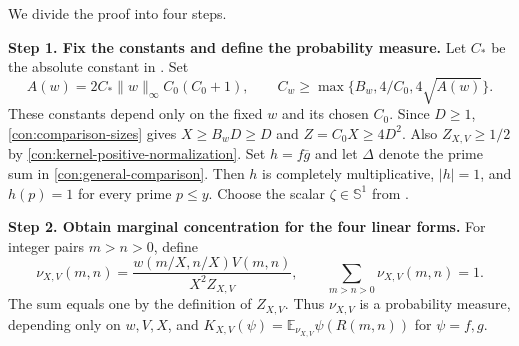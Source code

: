 \documentclass[twoside]{aomart}
\makeatletter
\theoremstyle{paperplain}
\theoremstyle{paperdefinition}
\renewenvironment{proof}[1][\proofname]{\par\pushQED{\qed}%
  \normalfont\topsep6\p@\@plus3\p@\relax\trivlist
  \item[\hskip\labelsep\itshape #1\@addpunct{.}]\ignorespaces
}{\popQED\endtrivlist\@endpefalse}
\newcommand{\E}{\mathbb E}
\numberwithin{equation}{section}
\makeatother
\begin{document}
\begin{proof}
We divide the proof into four steps.

\medskip
\noindent\textbf{Step 1. Fix the constants and define the probability measure.}
Let $C_*$ be the absolute constant in .
Set
\begin{equation}
 A(w)=2C_*\|w\|_\infty C_0(C_0+1),
 \qquad C_w\ge\max\{B_w,4/C_0,4\sqrt{A(w)}\}.
 \label{con:comparison-constants}
\end{equation}
These constants depend only on the fixed $w$ and its chosen $C_0$.
Since $D\ge1$, \eqref{con:comparison-sizes} gives
$X\ge B_wD\ge D$ and $Z=C_0X\ge4D^2$.
Also $Z_{X,V}\ge1/2$ by \eqref{con:kernel-positive-normalization}.
Set $h=f\overline g$ and let $\Delta$ denote the prime sum in
\eqref{con:general-comparison}.
Then $h$ is completely multiplicative, $|h|=1$, and $h(p)=1$
for every prime $p\le y$.
Choose the scalar $\zeta\in\mathbb S^1$ from .

\medskip
\noindent\textbf{Step 2. Obtain marginal concentration for the four linear forms.}
For integer pairs $m>n>0$, define
\begin{equation*}
 \nu_{X,V}(m,n)=\frac{w(m/X,n/X)V(m,n)}{X^2Z_{X,V}},
 \qquad \sum_{m>n>0}\nu_{X,V}(m,n)=1.
 \end{equation*}
The sum equals one by the definition of $Z_{X,V}$.
Thus $\nu_{X,V}$ is a probability measure, depending only on $w,V,X$,
and $K_{X,V}(\psi)=\E_{\nu_{X,V}}\psi(R(m,n))$ for $\psi=f,g$.


\end{proof}
\end{document}
